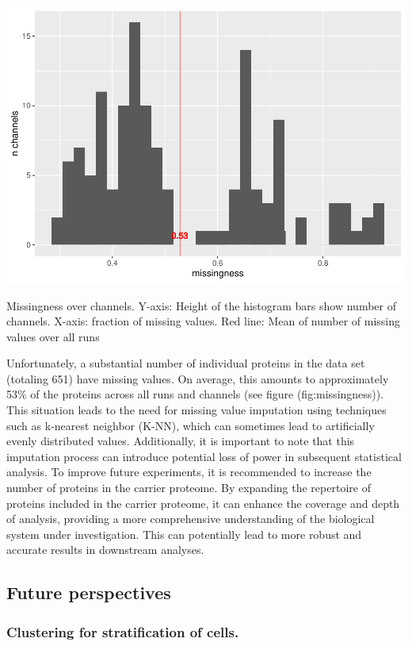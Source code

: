 \documentclass[
  11pt,
]{article}
\begin{document}
{\centering \includegraphics[width=0.9\linewidth]{Thesis_files/figure-latex/missingness-1} 

}

\caption{Missingness over channels. Y-axis: Height of the histogram bars show number of channels. X-axis: fraction of missing values. Red line: Mean of number of missing values over all runs}\label{fig:missingness}
 \endfigure\egroup

Unfortunately, a substantial number of individual proteins in the data set (totaling 651) have missing values. On average, this amounts to approximately 53\% of the proteins across all runs and channels (see figure (fig:missingness)).
This situation leads to the need for missing value imputation using techniques such as k-nearest neighbor (K-NN), which can sometimes lead to artificially evenly distributed values. Additionally, it is important to note that this imputation process can introduce potential loss of power in subsequent statistical analysis.
To improve future experiments, it is recommended to increase the number of proteins in the carrier proteome. By expanding the repertoire of proteins included in the carrier proteome, it can enhance the coverage and depth of analysis, providing a more comprehensive understanding of the biological system under investigation. This can potentially lead to more robust and accurate results in downstream analyses.

\hypertarget{future-perspectives}{%
\subsection{Future perspectives}\label{future-perspectives}}

\hypertarget{clustering-for-stratification-of-cells.}{%
\subsubsection{Clustering for stratification of cells.}\label{clustering-for-stratification-of-cells.}}
\end{document}
